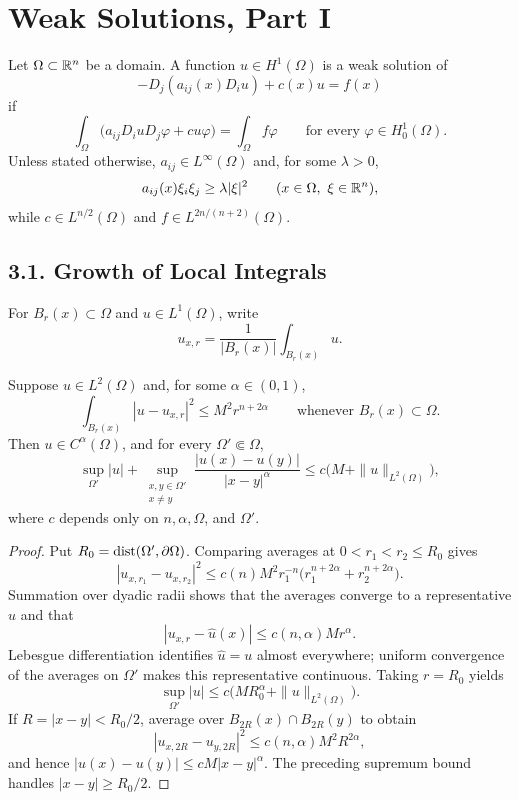 \chapter{Weak Solutions, Part I}

Let $\Omega\subset\mathbb{R}^n$ be a domain. A function $u\in H^1(\Omega)$ is a weak
solution of
\[
-D_j(a_{ij}(x)D_i u)+c(x)u=f(x)
\]
if
\[
\int_\Omega \bigl(a_{ij}D_i uD_j\varphi+cu\varphi\bigr)
=\int_\Omega f\varphi
\qquad\text{for every }\varphi\in H^1_0(\Omega).
\]
Unless stated otherwise, $a_{ij}\in L^\infty(\Omega)$ and, for some
$\lambda>0$,
\[
a_{ij}(x)\xi_i\xi_j\geq\lambda|\xi|^2
\qquad(x\in\Omega,\ \xi\in\mathbb{R}^n),
\]
while $c\in L^{n/2}(\Omega)$ and
$f\in L^{2n/(n+2)}(\Omega)$.

\section*{3.1. Growth of Local Integrals}

For $B_r(x)\subset\Omega$ and $u\in L^1(\Omega)$, write
\[
u_{x,r}=\frac{1}{|B_r(x)|}\int_{B_r(x)}u.
\]

\begin{theorem}\label{hanlin:weaksol-part1-campanato}
Suppose $u\in L^2(\Omega)$ and, for some $\alpha\in(0,1)$,
\[
\int_{B_r(x)}|u-u_{x,r}|^2\leq M^2r^{n+2\alpha}
\qquad\text{whenever }B_r(x)\subset\Omega.
\]
Then $u\in C^\alpha(\Omega)$, and for every $\Omega'\Subset\Omega$,
\[
\sup_{\Omega'}|u|+
\sup_{\substack{x,y\in\Omega'\\x\ne y}}
\frac{|u(x)-u(y)|}{|x-y|^\alpha}
\leq c\bigl(M+\|u\|_{L^2(\Omega)}\bigr),
\]
where $c$ depends only on $n,\alpha,\Omega$, and $\Omega'$.
\end{theorem}
\begin{proof}
\sketch Put $R_0=\operatorname{dist}(\Omega',\partial\Omega)$. Comparing averages at
$0<r_1<r_2\leq R_0$ gives
\[
|u_{x,r_1}-u_{x,r_2}|^2
\leq c(n)M^2r_1^{-n}
\bigl(r_1^{n+2\alpha}+r_2^{n+2\alpha}\bigr).
\]
Summation over dyadic radii shows that the averages converge to a representative
$\widehat u$ and that
\[
|u_{x,r}-\widehat u(x)|\leq c(n,\alpha)Mr^\alpha.
\]
Lebesgue differentiation identifies $\widehat u=u$ almost everywhere; uniform
convergence of the averages on $\Omega'$ makes this representative continuous.
Taking $r=R_0$ yields
\[
\sup_{\Omega'}|u|
\leq c\bigl(MR_0^\alpha+\|u\|_{L^2(\Omega)}\bigr).
\]
If $R=|x-y|<R_0/2$, average over
$B_{2R}(x)\cap B_{2R}(y)$ to obtain
\[
|u_{x,2R}-u_{y,2R}|^2\leq c(n,\alpha)M^2R^{2\alpha},
\]
and hence $|u(x)-u(y)|\leq cM|x-y|^\alpha$. The preceding supremum
bound handles $|x-y|\geq R_0/2$.
\end{proof}

